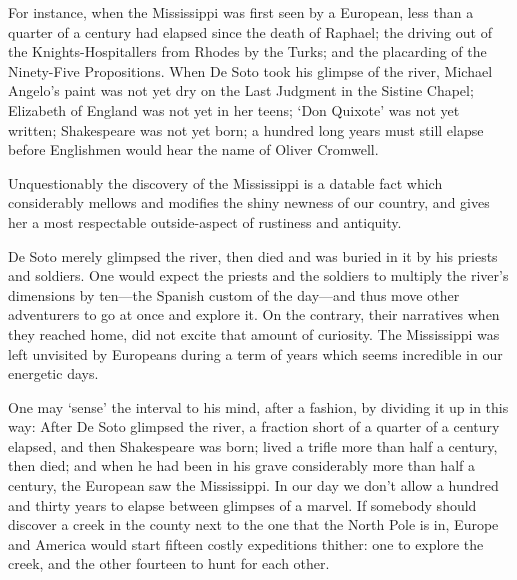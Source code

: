 \documentclass{novelette} %
\begin{document}
For instance, when the Mississippi was first seen by a European, less
than a quarter of a century had elapsed since the death of Raphael;
the driving out of the Knights-Hospitallers from Rhodes by
the Turks; and the placarding of the Ninety-Five Propositions.
When De Soto took his glimpse of the river,
Michael Angelo's paint was not yet dry on the Last
Judgment in the Sistine Chapel; Elizabeth of England was not yet in her teens;
`Don Quixote' was not yet written; Shakespeare was not yet born;
a hundred long years must
still elapse before Englishmen would hear the name of Oliver Cromwell.

Unquestionably the discovery of the Mississippi is a datable fact which
considerably mellows and modifies the shiny newness of our country, and
gives her a most respectable outside-aspect of rustiness and antiquity.

De Soto merely glimpsed the river, then died and was buried in it by his
priests and soldiers. One would expect the priests and the soldiers
to multiply the river's dimensions by ten---the Spanish custom of the
day---and thus move other adventurers to go at once and explore it. On
the contrary, their narratives when they reached home, did not excite
that amount of curiosity. The Mississippi was left unvisited by Europeans
during a term of years which seems incredible in our energetic days.

One may `sense' the interval to his mind, after a fashion, by dividing it
up in this way: After De Soto glimpsed the river, a fraction short of
a quarter of a century elapsed, and then Shakespeare was born; lived a
trifle more than half a century, then died; and when he had been in his
grave considerably more than half a century, the  European saw
the Mississippi. In our day we don't allow a hundred and thirty years to
elapse between glimpses of a marvel. If somebody should discover a creek
in the county next to the one that the North Pole is in, Europe and
America would start fifteen costly expeditions thither: one to explore
the creek, and the other fourteen to hunt for each other.
\end{document}
